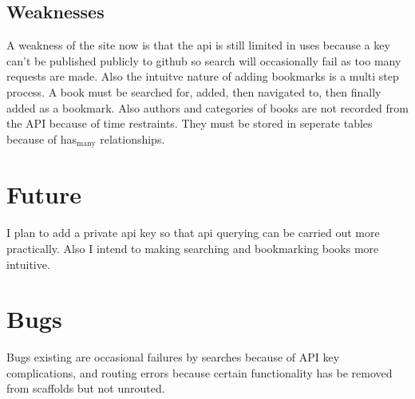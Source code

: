\documentclass[11pt]{article}
\begin{document}
\subsection{Weaknesses}
\label{sec-5-3}

   A weakness of the site now is that the api is still limited in uses because a key can't be published publicly to github so search will occasionally fail as too many requests are made.  Also the intuitve nature of adding bookmarks is a multi step process.  A book must be searched for, added, then navigated to, then finally added as a bookmark.
   Also authors and categories of books are not recorded from the API because of time restraints.  They must be stored in seperate tables because of has$_{\mathrm{many}}$ relationships.
\section{Future}
\label{sec-6}

  I plan to add a private api key so that api querying can be carried out more practically.  Also I intend to making searching and bookmarking books more intuitive.
\section{Bugs}
\label{sec-7}

  Bugs existing are occasional failures by searches because of API key complications, and routing errors because certain functionality has be removed from scaffolds but not unrouted.
\end{document}
